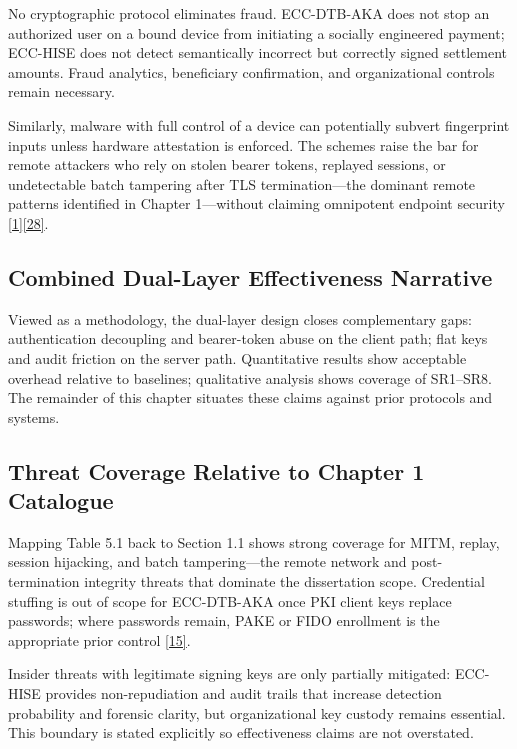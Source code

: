 \indent No cryptographic protocol eliminates fraud. ECC-DTB-AKA does not stop an authorized user on a bound device from initiating a socially engineered payment; ECC-HISE does not detect semantically incorrect but correctly signed settlement amounts. Fraud analytics, beneficiary confirmation, and organizational controls remain necessary.

\indent Similarly, malware with full control of a device can potentially subvert fingerprint inputs unless hardware attestation is enforced. The schemes raise the bar for remote attackers who rely on stolen bearer tokens, replayed sessions, or undetectable batch tampering after TLS termination---the dominant remote patterns identified in Chapter 1---without claiming omnipotent endpoint security \hyperref[ref:1]{[1]}\hyperref[ref:28]{[28]}.

\subsection{Combined Dual-Layer Effectiveness Narrative}

\indent Viewed as a methodology, the dual-layer design closes complementary gaps: authentication decoupling and bearer-token abuse on the client path; flat keys and audit friction on the server path. Quantitative results show acceptable overhead relative to baselines; qualitative analysis shows coverage of SR1--SR8. The remainder of this chapter situates these claims against prior protocols and systems.

\subsection{Threat Coverage Relative to Chapter 1 Catalogue}

\indent Mapping Table 5.1 back to Section 1.1 shows strong coverage for MITM, replay, session hijacking, and batch tampering---the remote network and post-termination integrity threats that dominate the dissertation scope. Credential stuffing is out of scope for ECC-DTB-AKA once PKI client keys replace passwords; where passwords remain, PAKE or FIDO enrollment is the appropriate prior control \hyperref[ref:15]{[15]}.

\indent Insider threats with legitimate signing keys are only partially mitigated: ECC-HISE provides non-repudiation and audit trails that increase detection probability and forensic clarity, but organizational key custody remains essential. This boundary is stated explicitly so effectiveness claims are not overstated.

